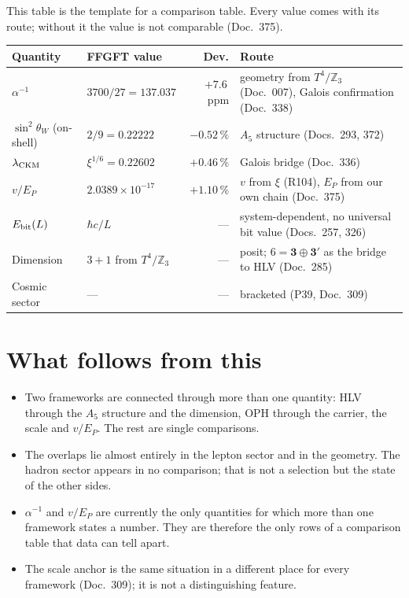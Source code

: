This table is the template for a comparison table. Every value comes with its
route; without it the value is not comparable (Doc.~375).

\begin{center}
\small
\begin{tabular}{@{}llrl@{}}
\toprule
\textbf{Quantity} & \textbf{FFGFT value} & \textbf{Dev.} & \textbf{Route} \\
\midrule
$\alpha^{-1}$ & $3700/27=137.037$ & $+7.6$\,ppm &
  geometry from $T^4/\mathbb{Z}_3$ (Doc.~007), Galois confirmation (Doc.~338) \\
$\sin^2\theta_W$ (on-shell) & $2/9=0.22222$ & $-0.52\,\%$ &
  $A_5$ structure (Docs.~293, 372) \\
$\lambda_{\rm CKM}$ & $\xi^{1/6}=0.22602$ & $+0.46\,\%$ &
  Galois bridge (Doc.~336) \\
$v/E_P$ & $2.0389\times10^{-17}$ & $+1.10\,\%$ &
  $v$ from $\xi$ (R104), $E_P$ from our own chain (Doc.~375) \\
$E_{\rm bit}(L)$ & $\hbar c/L$ & --- &
  system-dependent, no universal bit value (Docs.~257, 326) \\
Dimension & $3{+}1$ from $T^4/\mathbb{Z}_3$ & --- &
  posit; $6=\mathbf{3}\oplus\mathbf{3'}$ as the bridge to HLV (Doc.~285) \\
Cosmic sector & --- & --- &
  bracketed (P39, Doc.~309) \\
\bottomrule
\end{tabular}
\end{center}

\section{What follows from this}

\begin{itemize}\itemsep2pt
\item Two frameworks are connected through more than one quantity: HLV through
  the $A_5$ structure and the dimension, OPH through the carrier, the scale
  and $v/E_P$. The rest are single comparisons.
\item The overlaps lie almost entirely in the lepton sector and in the
  geometry. The hadron sector appears in no comparison; that is not a
  selection but the state of the other sides.
\item $\alpha^{-1}$ and $v/E_P$ are currently the only quantities for which
  more than one framework states a number. They are therefore the only rows of
  a comparison table that data can tell apart.
\item The scale anchor is the same situation in a different place for every
  framework (Doc.~309); it is not a distinguishing feature.
\end{itemize}

